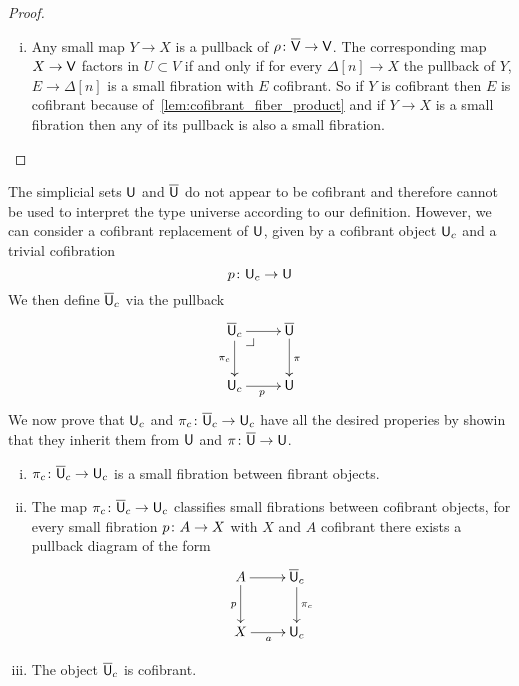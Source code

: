 \documentclass[reqno,10pt,a4paper,oneside,draft]{amsart}
\begin{document}
\begin{proof}
\begin{enumerate}[(i)]
\item Any small map $Y \rightarrow X$ is a pullback of $\rho \colon \overline{\mathsf{V}} \rightarrow \mathsf{V}$. The corresponding map $X \rightarrow \mathsf{V}$ factors in $U \subset V$ if and only if for every $\Delta[n] \rightarrow X$ the pullback of $Y$, $E \rightarrow \Delta[n]$ is a small fibration with $E$ cofibrant. So if $Y$ is cofibrant then $E$ is cofibrant because of~\cref{lem:cofibrant_fiber_product} and if $Y \rightarrow X$ is a small fibration then any of its pullback is also a small fibration.  \qedhere
\end{enumerate}
\end{proof} 



The simplicial sets $\mathsf{U}$ and $\overline{\mathsf{U}}$ do not appear to be cofibrant and therefore cannot be used to interpret the type universe according to our definition. However, we can consider a cofibrant replacement of $\mathsf{U}$, given by a cofibrant object $\mathsf{U}_c$ and a trivial cofibration
\begin{equation}
\label{equ:ucu}
p \colon \mathsf{U}_c \rightarrow \mathsf{U}
\end{equation}
We then define $\overline{\mathsf{U}}_c$ via the pullback
\[
\xymatrix{
\UU_c \ar[d]_{\pi_c} \ar[r] \drpullback & \UU \ar[d]^{\pi}  \\
\U_c \ar[r]_p & \U}
\]
We now prove that $\mathsf{U}_c$ and $\pi_c \colon \overline{\mathsf{U}}_c \to \mathsf{U}_c$ have all the desired properies by showin that 
they inherit them from $\mathsf{U}$ and $\pi \colon \overline{\mathsf{U}} \to \mathsf{U}$.


\begin{proposition} \label{thm:universe-uc} 
\hfill 
\begin{enumerate}[(i)] 
\item $\pi_c \colon \overline{\mathsf{U}}_c \to \mathsf{U}_c$ is a small fibration between fibrant objects. 
\item The map $\pi_c \colon \overline{\mathsf{U}}_c \to \mathsf{U}_c$ classifies small fibrations between cofibrant objects, \ie 
for every small fibration $p \colon A \to X$ with $X$ and $A$ cofibrant there exists a pullback diagram of the form
\[
\xymatrix{
A \ar[r] \ar[d]_p & \UU_c \ar[d]^{\pi_c} \\
X \ar[r]_a & \U_c }
\]
\item The object $\overline{\mathsf{U}}_c$ is cofibrant. 
\end{enumerate}
\end{proposition}
\end{document}
